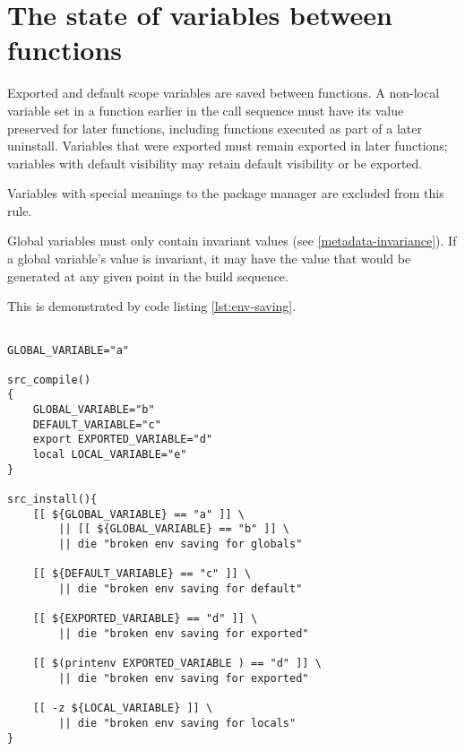 \section{The state of variables between functions}
\label{ebuild-env-state}

Exported and default scope variables are saved between functions. A non-local variable set in a
function earlier in the call sequence must have its value preserved for later functions, including
functions executed as part of a later uninstall. Variables that were exported must remain exported
in later functions; variables with default visibility may retain default visibility or be exported.

Variables with special meanings to the package manager are excluded from this rule.

Global variables must only contain invariant values (see \ref{metadata-invariance}). If a global
variable's value is invariant, it may have the value that would be generated at any given point
in the build sequence.

This is demonstrated by code listing \ref{lst:env-saving}.

\begin{lstlisting}[float,caption=Environment state between functions,label=lst:env-saving]

GLOBAL_VARIABLE="a"

src_compile()
{
    GLOBAL_VARIABLE="b"
    DEFAULT_VARIABLE="c"
    export EXPORTED_VARIABLE="d"
    local LOCAL_VARIABLE="e"
}

src_install(){
    [[ ${GLOBAL_VARIABLE} == "a" ]] \
        || [[ ${GLOBAL_VARIABLE} == "b" ]] \
        || die "broken env saving for globals"

    [[ ${DEFAULT_VARIABLE} == "c" ]] \
        || die "broken env saving for default"

    [[ ${EXPORTED_VARIABLE} == "d" ]] \
        || die "broken env saving for exported"

    [[ $(printenv EXPORTED_VARIABLE ) == "d" ]] \
        || die "broken env saving for exported"

    [[ -z ${LOCAL_VARIABLE} ]] \
        || die "broken env saving for locals"
}
\end{lstlisting}

